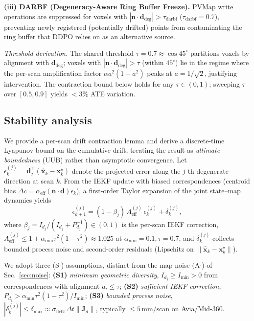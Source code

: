 \documentclass[conference]{IEEEtran}
\newcommand{\xhat}{\hat{\mathbf{x}}}
\newcommand{\bvec}[1]{\mathbf{#1}}
\begin{document}
\textbf{(iii) DARBF (Degeneracy-Aware Ring Buffer Freeze).}
PVMap write operations are suppressed for voxels with
$|\bvec{n} \cdot \bvec{d}_\mathrm{deg}| > \tau_\mathrm{darbf}$
($\tau_\mathrm{darbf}{=}0.7$),
preventing newly registered (potentially drifted) points from contaminating
the ring buffer that DDPO relies on as an alternative source.

\emph{Threshold derivation.}
The shared threshold $\tau{=}0.7 \approx \cos 45^\circ$ partitions voxels
by alignment with $\bvec{d}_\mathrm{deg}$; voxels with
$|\bvec{n}\cdot\bvec{d}_\mathrm{deg}|>\tau$ (within $45^\circ$) lie in
the regime where the per-scan amplification factor
$\alpha a^2(1{-}a^2)$ peaks at $a{=}1/\!\sqrt{2}$, justifying
intervention. The contraction bound below holds for any
$\tau \in (0,1)$; sweeping $\tau$ over $[0.5, 0.9]$ yields ${<}3\%$ ATE
variation.

\subsection{Stability analysis}\label{sec:stability}

We provide a per-scan drift contraction lemma and derive a discrete-time
Lyapunov bound on the cumulative drift, treating the result as
\emph{ultimate boundedness} (UUB) rather than asymptotic convergence.
Let $\epsilon_k^{(j)} = \bvec{d}_j^\top(\xhat_k - \bvec{x}_k^\star)$
denote the projected error along the $j$-th degenerate direction at
scan $k$. From the IEKF update with biased correspondences (centroid
bias $\Delta c{=}\alpha_\mathrm{eff}(\bvec{n}\cdot\bvec{d})\epsilon_k$),
a first-order Taylor expansion of the joint state--map dynamics yields
\begin{equation}\label{eq:drift_lin}
  \epsilon_{k+1}^{(j)} = (1{-}\beta_j)\,A_\mathrm{eff}^{(j)}\,
  \epsilon_k^{(j)} + \delta_k^{(j)},
\end{equation}
where $\beta_j{=}I_{d_j}/(I_{d_j}{+}P_{d_j}^{-1}){\in}(0,1)$ is the
per-scan IEKF correction, $A_\mathrm{eff}^{(j)}{\le}
1{+}\alpha_\mathrm{min}\tau^2(1{-}\tau^2){\approx}1.025$ at
$\alpha_\mathrm{min}{=}0.1,\tau{=}0.7$, and $\delta_k^{(j)}$ collects
bounded process noise and second-order residuals (Lipschitz on
$\|\xhat_k{-}\bvec{x}_k^\star\|$).

We adopt three (S$\cdot$) assumptions, distinct from the map-noise
(A$\cdot$) of Sec.~\ref{sec:noise}:
\textbf{(S1)} \emph{minimum geometric diversity}, $I_{d_j}{\ge}I_\mathrm{min}{>}0$
from correspondences with alignment $a_i{\le}\tau$;
\textbf{(S2)} \emph{sufficient IEKF correction}, $P_{d_j}{>}
\alpha_\mathrm{min}\tau^2(1{-}\tau^2)/I_\mathrm{min}$;
\textbf{(S3)} \emph{bounded process noise},
$|\delta_k^{(j)}|{\le}\delta_\mathrm{max}{\approx}\sigma_\mathrm{IMU}\Delta t\|\bvec{J}_d\|$,
typically $\le 5$\,mm/scan on Avia/Mid-360.
\end{document}
